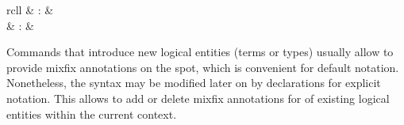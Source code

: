 \begin{isabellebody}
\begin{isamarkuptext}
\begin{matharray}{rcll}
    \hypertarget{command.no-notation}{\hyperlink{command.no-notation}{\mbox{}}} & : &  \\
    \hypertarget{command.write}{\hyperlink{command.write}{\mbox{}}} & : &  \\
  \end{matharray}

  Commands that introduce new logical entities (terms or types)
  usually allow to provide mixfix annotations on the spot, which is
  convenient for default notation.  Nonetheless, the syntax may be
  modified later on by declarations for explicit notation.  This
  allows to add or delete mixfix annotations for of existing logical
  entities within the current context.


\end{isamarkuptext}
\end{isabellebody}
